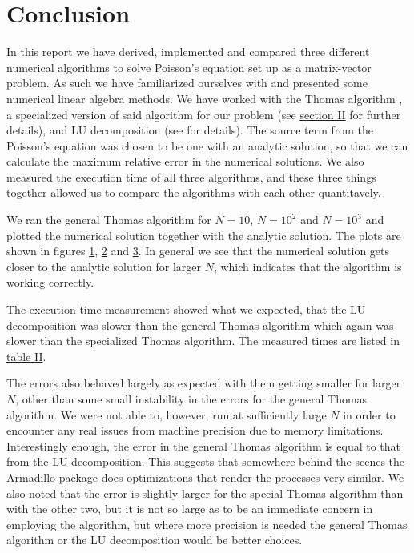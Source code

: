 \documentclass[english,notitlepage,reprint,nofootinbib]{revtex4-1}  %
\begin{document}
\newpage

\section{Conclusion} \label{sec:V}

In this report we have derived, implemented and compared three different numerical algorithms to solve Poisson's equation set up as a matrix-vector problem. As such we have familiarized ourselves with and presented some numerical linear algebra methods. We have worked with the Thomas algorithm \citep{Thomas1949}, a specialized version of said algorithm for our problem (see \hyperref[sec:II]{section II} for further details), and LU decomposition (see \citep{Hjorth-Jensen2018} for details). The source term from the Poisson's equation was chosen to be one with an analytic solution, so that we can calculate the maximum relative error in the numerical solutions. We also measured the execution time of all three algorithms, and these three things together allowed us to compare the algorithms with each other quantitavely. 

We ran the general Thomas algorithm for $N=10$, $N=10^2$ and $N=10^3$ and plotted the numerical solution together with the analytic solution. The plots are shown in figures \hyperref[fig:iv:a:1]{1}, \hyperref[fig:iv:a:2]{2} and \hyperref[fig:iv:a:3]{3}. In general we see that the numerical solution gets closer to the analytic solution for larger $N$, which indicates that the algorithm is working correctly.

The execution time measurement showed what we expected, that the LU decomposition was slower than the general Thomas algorithm which again was slower than the specialized Thomas algorithm. The measured times are listed in \hyperref[table:iv:c:1]{table II}.

The errors also behaved largely as expected with them getting smaller for larger $N$, other than some small instability in the errors for the general Thomas algorithm. We were not able to, however, run at sufficiently large $N$ in order to encounter any real issues from machine precision due to memory limitations. Interestingly enough, the error in the general Thomas algorithm is equal to that from the LU decomposition. This suggests that somewhere behind the scenes the Armadillo package does optimizations that render the processes very similar. We also noted that the error is slightly larger for the special Thomas algorithm than with the other two, but it is not so large as to be an immediate concern in employing the algorithm, but where more precision is needed the general Thomas algorithm or the LU decomposition would be better choices.
\end{document}
